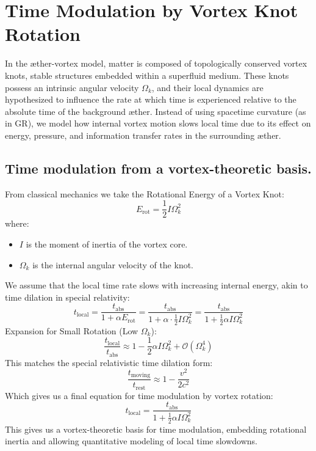 
\section{Time Modulation by Vortex Knot Rotation}

In the æther-vortex model, matter is composed of topologically conserved vortex knots, stable structures embedded within a superfluid medium. These knots possess an intrinsic angular velocity $\Omega_k$, and their local dynamics are hypothesized to influence the rate at which time is experienced relative to the absolute time of the background æther.
Instead of using spacetime curvature (as in GR), we model how internal vortex motion slows local time due to its effect on energy, pressure, and information transfer rates in the surrounding æther.



\subsection{Time modulation from a vortex-theoretic basis.}
From classical mechanics we take the Rotational Energy of a Vortex Knot:
\[
    E_{\text{rot}} = \frac{1}{2} I \Omega_k^2
\]
where:
\begin{itemize}
    \item $I$ is the moment of inertia of the vortex core.
    \item $\Omega_k$ is the internal angular velocity of the knot.
\end{itemize}
We assume that the local time rate slows with increasing internal energy, akin to time dilation in special relativity:
\[
    t_{\text{local}} = \frac{t_{\text{abs}}}{1 + \alpha E_{\text{rot}}} = \frac{t_{\text{abs}}}{1 + \alpha \cdot \frac{1}{2} I \Omega_k^2} = \frac{t_{\text{abs}}}{1 + \frac{1}{2} \alpha I \Omega_k^2}
\]
Expansion for Small Rotation (Low $\Omega_k$):
\[
    \frac{t_{\text{local}}}{t_{\text{abs}}} \approx 1 - \frac{1}{2} \alpha I \Omega_k^2 + \mathcal{O}(\Omega_k^4)
\]
This matches the special relativistic time dilation form:
\[
    \frac{t_{\text{moving}}}{t_{\text{rest}}} \approx 1 - \frac{v^2}{2c^2}
\]
Which gives us a final equation for time modulation by vortex rotation:
\[
    t_{\text{local}} = \frac{t_{\text{abs}}}{1 + \frac{1}{2} \alpha I \Omega_k^2}
\]
This gives us a vortex-theoretic basis for time modulation, embedding rotational inertia and allowing quantitative modeling of local time slowdowns.


